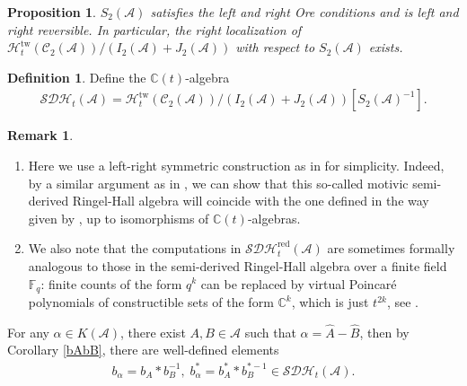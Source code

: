 \documentclass[12pt]{amsart}
\newtheorem{proposition}[theorem]{Proposition}
\theoremstyle{definition}
\newtheorem{definition}[theorem]{Definition}
\newtheorem{remark}[theorem]{Remark}
\numberwithin{equation}{section}
\begin{document}
\begin{proposition}
    $ S_2(\mathcal{A}) $  satisfies the left and right Ore conditions and is left and right reversible. 
    In particular, the right localization of $ \mathcal{H}_t^{\mathrm{tw}}(\mathcal{C}_2(\mathcal{A}))/(I_2(\mathcal{A})+J_2(\mathcal{A}))$ with respect to $ S_2(\mathcal{A}) $ exists.
\end{proposition}

\begin{definition}
    Define the $ \mathbb{C}(t) $-algebra
    \begin{align*}
        \mathcal{SDH}_t(\mathcal{A}) = \mathcal{H}_t^{\mathrm{tw}}(\mathcal{C}_2(\mathcal{A}))/(I_2(\mathcal{A})+J_2(\mathcal{A}))[S_2(\mathcal{A})^{-1}].
    \end{align*}
\end{definition}

\begin{remark}\;
   \label{q = t^2}

    \begin{enumerate}
        \item Here we use a left-right symmetric construction as in \cite[Section 4.2]{CH24} for simplicity. 
    Indeed, by a similar argument as in \cite[Lemma 4.7]{CH24}, we can show that this so-called motivic semi-derived Ringel-Hall algebra will coincide with the one defined in the way given by \cite{LP21}, up to isomorphisms of $ \mathbb{C}(t) $-algebras. 
     \item We also note that the computations in $ \mathcal{SDH}_t^{\mathrm{red}}(\mathcal{A}) $ are sometimes formally analogous to those in the semi-derived Ringel-Hall algebra over a finite field $ \mathbb{F}_q $: finite counts of the form $ q^k $ can be replaced by virtual Poincaré polynomials of constructible sets of the form $ \mathbb{C}^k $, which is just $ t^{2k} $, see \cite[Example 5.21]{Joyce07}.
    \end{enumerate}
    
    

    
\end{remark}

For any $ \alpha \in K(\mathcal{A}) $, there exist $ A,B \in \mathcal{A} $ such that $ \alpha = \widehat{A} - \widehat{B} $, then by Corollary \ref{bAbB}, there are well-defined elements
\begin{align*}
    b_{\alpha} = b_A * b_B^{-1}, \; b_{\alpha}^* = b_A^* * b_B^{*-1} \in \mathcal{SDH}_t(\mathcal{A}).
\end{align*}
\end{document}
